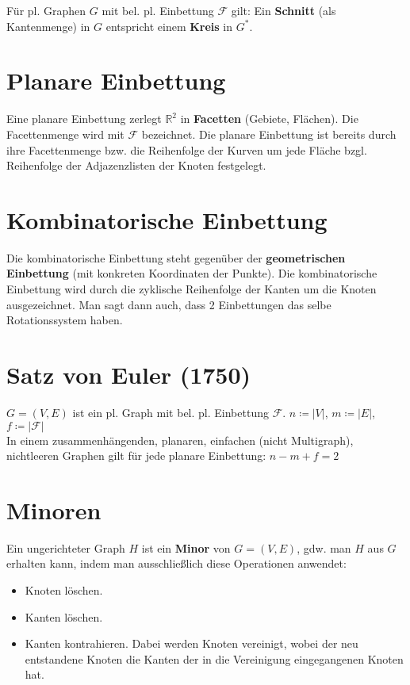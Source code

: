 \documentclass[a4paper,11pt]{report}
\begin{document}
Für pl. Graphen $G$ mit bel. pl. Einbettung $\mathcal{F}$ gilt: Ein {\bf Schnitt} (als Kantenmenge) in $G$ entspricht einem {\bf Kreis} in $G^*$.


\section{Planare Einbettung}
Eine planare Einbettung zerlegt $\mathbb{R}^2$ in {\bf Facetten} (Gebiete, Flächen). Die Facettenmenge wird mit $\mathcal{F}$ bezeichnet. Die planare Einbettung ist bereits durch ihre Facettenmenge bzw. die Reihenfolge der Kurven um jede Fläche bzgl. Reihenfolge der Adjazenzlisten der Knoten festgelegt.


\section{Kombinatorische Einbettung}
Die kombinatorische Einbettung steht gegenüber der {\bf geometrischen Einbettung} (mit konkreten Koordinaten der Punkte). Die kombinatorische Einbettung wird durch die zyklische Reihenfolge der Kanten um die Knoten ausgezeichnet. Man sagt dann auch, dass 2 Einbettungen das selbe Rotationssystem haben.


\section{Satz von Euler (1750)}
$G = (V, E)$ ist ein pl. Graph mit bel. pl. Einbettung $\mathcal{F}$. $n \coloneqq |V|$, $m \coloneqq |E|$, $f \coloneqq |\mathcal{F}|$\\

In einem zusammenhängenden, planaren, einfachen (nicht Multigraph), nichtleeren Graphen gilt für jede planare Einbettung: $n - m + f = 2$

\section{Minoren}
Ein ungerichteter Graph $H$ ist ein {\bf Minor} von $G = (V, E)$, gdw. man $H$ aus $G$ erhalten kann, indem man ausschließlich diese Operationen anwendet:

\begin{itemize}
    \item Knoten löschen.
    \item Kanten löschen.
    \item Kanten kontrahieren. Dabei werden Knoten vereinigt, wobei der neu entstandene Knoten die Kanten der in die Vereinigung eingegangenen Knoten hat.
\end{itemize}
\end{document}
